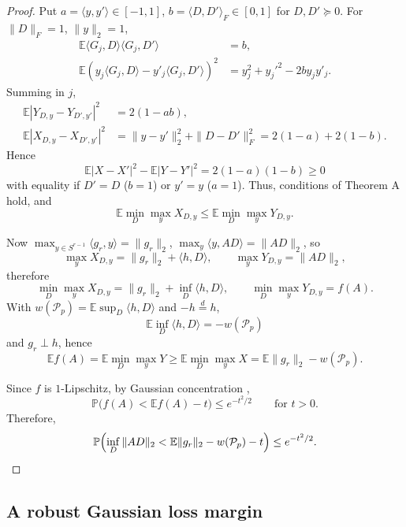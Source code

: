 \documentclass[11pt]{article}
\numberwithin{equation}{section}
\theoremstyle{definition}
\theoremstyle{remark}
\newcommand{\E}{\mathbb E}
\newcommand{\Pp}{\mathbb P}
\newcommand{\1}{\boldsymbol 1}
\begin{document}
\begin{aiblock}
\begin{proof}
    Put $a = \langle y, y' \rangle \in [-1,1]$, $b = \langle D, D' \rangle_{F} \in [0,1]$ for $D, D' \succeq 0$.
    For $\|D\|_{F} = 1$, $\|y\|_{2} = 1$,
    \begin{align*}
        \E\langle G_{j}, D \rangle \langle G_{j}, D' \rangle &= b, \\
        \E(y_{j} \langle G_{j}, D \rangle - y'_{j} \langle G_{j}, D' \rangle)^{2} &= y_{j}^{2} + y_{j}'^{2} - 2 b y_{j} y'_{j}.
    \end{align*}
    Summing in $j$,
    \begin{align*}
        \E|Y_{D, y} - Y_{D', y'}|^{2} &= 2 (1 - a b), \\
        \E|X_{D, y} - X_{D', y'}|^{2} &= \|y - y'\|_{2}^{2} + \|D - D'\|_{F}^{2} = 2 (1 - a) + 2 (1 - b).
    \end{align*}
    Hence
    \[
        \E|X - X'|^{2} - \E|Y - Y'|^{2} = 2 (1 - a) (1 - b) \ge 0
    \]
    with equality if $D' = D$ ($b = 1$) or $y' = y$ ($a = 1$).
    Thus, conditions of Theorem A hold, and
    \[
        \E \min_{D} \max_{y} X_{D, y} \le \E \min_{D} \max_{y} Y_{D, y}.
    \]

    Now $\max_{y \in S^{r - 1}} \langle g_{r}, y \rangle = \|g_{r}\|_{2}$, $\max_{y} \langle y, A D \rangle = \|A D\|_{2}$, so
    \[
        \max_{y}X_{D,y}= \|g_{r}\|_{2} + \langle h, D \rangle,
        \qquad
        \max_{y}Y_{D,y}= \|AD\|_{2},
    \]
    therefore
    \[
        \min_{D} \max_{y} X_{D,y} = \|g_{r}\|_{2} + \inf_{D}\langle h, D \rangle,
        \qquad
        \min_{D} \max_{y} Y_{D,y} = f(A).
    \]
    With $w(\mathcal P_{p}) = \E\sup_{D}\langle h, D\rangle$ and $-h\stackrel{d}=h$,
    \[
        \E\inf_{D}\langle h,D\rangle=-w(\mathcal P_{p})
    \]
    and $g_{r} \perp h$, hence
    \[
        \E f(A)
            = \E \min_{D} \max_{y} Y \ge \E\min_{D} \max_{y} X
            = \E \|g_{r}\|_{2} - w(\mathcal P_{p}).
    \]

    Since $f$ is $1$-Lipschitz, by Gaussian concentration \cite[Theorem 3.2]{Gordon1988},
    \[
        \Pp\bigl(f(A) < \E f(A) - t\bigr) \le e^{-t^{2}/2} \qquad \text{for $t > 0$}.
    \]
    Therefore,
    \[
        \Pp\Bigl(\inf_{D}\|A D\|_{2} < \E\|g_{r}\|_{2} - w(\mathcal P_{p}) - t\Bigr) \le e^{-t^{2}/2}.
    \]
\end{proof}



\subsection{A robust Gaussian loss margin}\label{a-robust-gaussian-loss-margin}


\end{aiblock}
\end{document}
